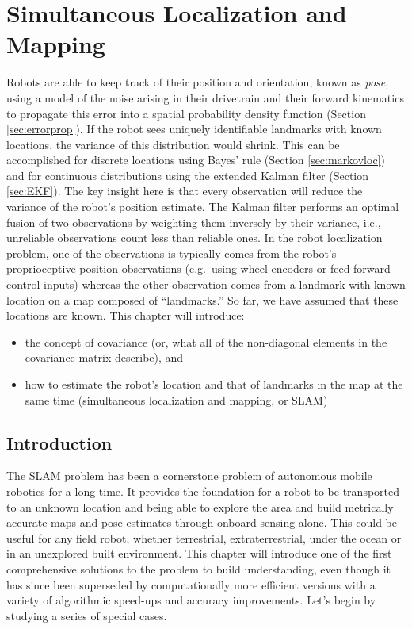 \chapter{Simultaneous Localization and Mapping}\label{chap:slam}
Robots are able to keep track of their position and orientation, known as \emph{pose}, using a model of the noise arising in their drivetrain and their forward kinematics to propagate this error into a spatial probability density function (Section \ref{sec:errorprop}). If the robot sees uniquely identifiable landmarks with known locations, the variance of this distribution would shrink. This can be accomplished for discrete locations using Bayes' rule (Section \ref{sec:markovloc}) and for continuous distributions using the extended Kalman filter (Section \ref{sec:EKF}). The key insight here is that every observation will reduce the variance of the robot's position estimate. The Kalman filter performs an optimal fusion of two observations by weighting them inversely by their variance, i.e., unreliable observations count less than reliable ones. In the robot localization problem, one of the observations is typically comes from the robot's proprioceptive position observations (e.g.\ using wheel encoders or feed-forward control inputs) whereas the other observation comes from a landmark with known location on a map composed of ``landmarks.'' So far, we have assumed that these locations are known. This chapter will introduce:

\begin{itemize}
\item the concept of covariance (or, what all of the non-diagonal elements in the covariance matrix describe), and
\item how to estimate the robot's location and that of landmarks in the map at the same time (simultaneous localization and mapping, or SLAM)
\end{itemize}

\section{Introduction}
The SLAM problem has been a cornerstone problem of autonomous mobile robotics for a long time. It provides the foundation for a robot to be transported to an unknown location and being able to explore the area and build metrically accurate maps and pose estimates through onboard sensing alone. This could be useful for any field robot, whether terrestrial, extraterrestrial, under the ocean or in an unexplored built environment. This chapter will introduce one of the first comprehensive solutions to the problem to build understanding, even though it has since been superseded by computationally more efficient versions with a variety of algorithmic speed-ups and accuracy improvements. Let's begin by studying a series of special cases.

